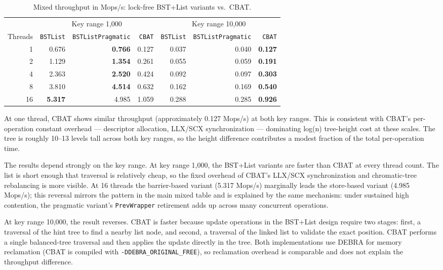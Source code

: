 \documentclass[a4paper,11pt]{article}
\newcommand{\code}[1]{\texttt{#1}}
\begin{document}
\begin{table}[H]
\centering
\caption{Mixed throughput in Mops/s: lock-free BST+List variants vs.\ CBAT.}
\label{tab:cbat-comparison}
\begin{tabular}{r r r r r r r}
\toprule
 & \multicolumn{3}{c}{Key range 1,000} & \multicolumn{3}{c}{Key range 10,000} \\
\cmidrule(lr){2-4}\cmidrule(lr){5-7}
Threads & \code{BSTList} & \code{BSTListPragmatic} & \code{CBAT} & \code{BSTList} & \code{BSTListPragmatic} & \code{CBAT} \\
\midrule
 1 & 0.676 & \textbf{0.766} & 0.127 & 0.037 & 0.040 & \textbf{0.127} \\
 2 & 1.129 & \textbf{1.354} & 0.261 & 0.055 & 0.059 & \textbf{0.191} \\
 4 & 2.363 & \textbf{2.520} & 0.424 & 0.092 & 0.097 & \textbf{0.303} \\
 8 & 3.810 & \textbf{4.514} & 0.632 & 0.162 & 0.169 & \textbf{0.540} \\
16 & \textbf{5.317} & 4.985 & 1.059 & 0.288 & 0.285 & \textbf{0.926} \\
\bottomrule
\end{tabular}
\end{table}

At one thread, CBAT shows similar throughput (approximately 0.127 Mops/s) at both key ranges. This is consistent with CBAT's per-operation constant overhead — descriptor allocation, LLX/SCX synchronization — dominating log(n) tree-height cost at these scales. The tree is roughly 10--13 levels tall across both key ranges, so the height difference contributes a modest fraction of the total per-operation time.

The results depend strongly on the key range. At key range 1,000, the BST+List variants are faster than CBAT at every thread count. The list is short enough that traversal is relatively cheap, so the fixed overhead of CBAT's LLX/SCX synchronization and chromatic-tree rebalancing is more visible. At 16 threads the barrier-based variant (5.317 Mops/s) marginally leads the store-based variant (4.985 Mops/s); this reversal mirrors the pattern in the main mixed table and is explained by the same mechanism: under sustained high contention, the pragmatic variant's \code{PrevWrapper} retirement adds up across many concurrent operations.

At key range 10,000, the result reverses. CBAT is faster because update operations in the BST+List design require two stages: first, a traversal of the hint tree to find a nearby list node, and second, a traversal of the linked list to validate the exact position. CBAT performs a single balanced-tree traversal and then applies the update directly in the tree. Both implementations use DEBRA for memory reclamation (CBAT is compiled with \texttt{-DDEBRA\_ORIGINAL\_FREE}), so reclamation overhead is comparable and does not explain the throughput difference.
\end{document}
